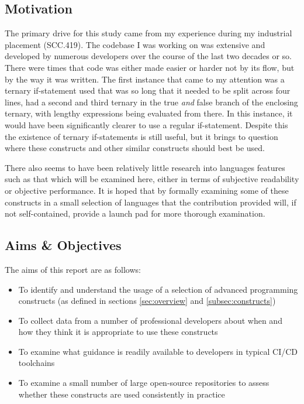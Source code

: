 \documentclass{article}
\begin{document}
    \subsection{Motivation}
        The primary drive for this study came from my experience during my industrial placement (SCC.419). The codebase I was working on was extensive and developed by numerous developers over the course of the last two decades or so. There were times that code was either made easier or harder not by its flow, but by the way it was written. The first instance that came to my attention was a ternary if-statement used that was so long that it needed to be split across four lines, had a second and third ternary in the true \emph{and} false branch of the enclosing ternary, with lengthy expressions being evaluated from there. In this instance, it would have been significantly clearer to use a regular if-statement. Despite this the existence of ternary if-statements is still useful, but it brings to question where these constructs and other similar constructs should best be used.

        There also seems to have been relatively little research into languages features such as that which will be examined here, either in terms of subjective readability or objective performance. It is hoped that by formally examining some of these constructs in a small selection of languages that the contribution provided will, if not self-contained, provide a launch pad for more thorough examination.
    \subsection{Aims \& Objectives}
        The aims of this report are as follows:
        \begin{itemize}
            \item To identify and understand the usage of a selection of advanced programming constructs (as defined in sections \ref{sec:overview} and \ref{subsec:constructs})
            \item To collect data from a number of professional developers about when and how they think it is appropriate to use these constructs
            \item To examine what guidance is readily available to developers in typical CI/CD toolchains
            \item To examine a small number of large open-source repositories to assess whether these constructs are used consistently in practice
        \end{itemize}
\end{document}
